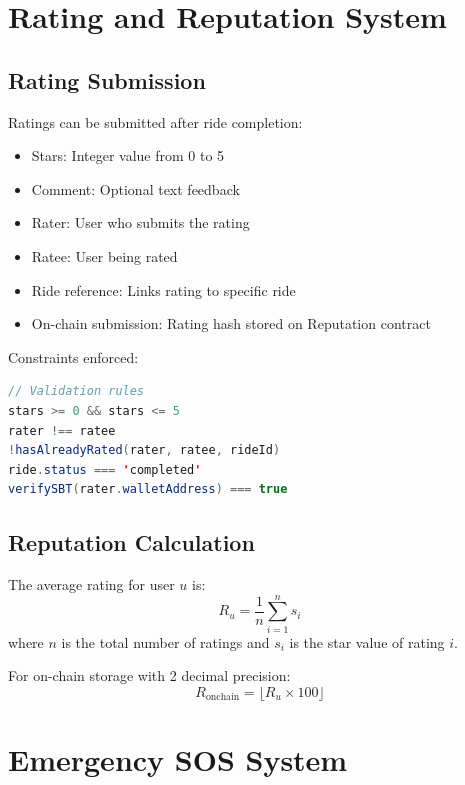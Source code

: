 \section{Rating and Reputation System}

\subsection{Rating Submission}

Ratings can be submitted after ride completion:

\begin{itemize}
    \item Stars: Integer value from 0 to 5
    \item Comment: Optional text feedback
    \item Rater: User who submits the rating
    \item Ratee: User being rated
    \item Ride reference: Links rating to specific ride
    \item On-chain submission: Rating hash stored on Reputation contract
\end{itemize}

Constraints enforced:
\begin{lstlisting}[language=Java, caption=Rating Validation Rules]
// Validation rules
stars >= 0 && stars <= 5
rater !== ratee
!hasAlreadyRated(rater, ratee, rideId)
ride.status === 'completed'
verifySBT(rater.walletAddress) === true
\end{lstlisting}

\subsection{Reputation Calculation}

The average rating for user $u$ is:
\begin{equation}
R_u = \frac{1}{n} \sum_{i=1}^{n} s_i
\end{equation}
where $n$ is the total number of ratings and $s_i$ is the star value of rating $i$.

For on-chain storage with 2 decimal precision:
\begin{equation}
R_{\text{onchain}} = \lfloor R_u \times 100 \rfloor
\end{equation}

\section{Emergency SOS System}

